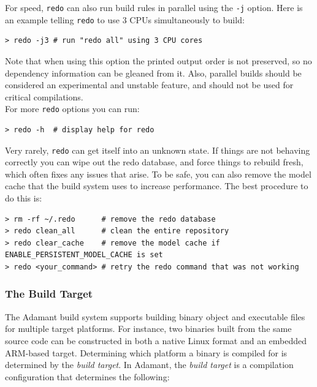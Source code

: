 For speed, \texttt{redo} can also run build rules in parallel using the \texttt{-j} option. Here is an example telling \texttt{redo} to use 3 CPUs simultaneously to build:

\vspace{5mm} %
\begin{verbatim}
> redo -j3 # run "redo all" using 3 CPU cores
\end{verbatim}
\vspace{5mm} %

Note that when using this option the printed output order is not preserved, so no dependency information can be gleaned from it. Also, parallel builds should be considered an experimental and unstable feature, and should not be used for critical compilations. \\

For more \texttt{redo} options you can run:

\vspace{5mm} %
\begin{verbatim}
> redo -h  # display help for redo
\end{verbatim}
\vspace{5mm} %

Very rarely, \texttt{redo} can get itself into an unknown state. If things are not behaving correctly you can wipe out the redo database, and force things to rebuild fresh, which often fixes any issues that arise. To be safe, you can also remove the model cache that the build system uses to increase performance. The best procedure to do this is:

\vspace{5mm} %
\begin{verbatim}
> rm -rf ~/.redo      # remove the redo database
> redo clean_all      # clean the entire repository
> redo clear_cache    # remove the model cache if ENABLE_PERSISTENT_MODEL_CACHE is set
> redo <your_command> # retry the redo command that was not working
\end{verbatim}
\vspace{5mm} %

\subsubsection{The Build Target} \label{The Build Target}

The Adamant build system supports building binary object and executable files for multiple target platforms. For instance, two binaries built from the same source code can be constructed in both a native Linux format and an embedded ARM-based target. Determining which platform a binary is compiled for is determined by the \textit{build target}. In Adamant, the \textit{build target} is a compilation configuration that determines the following:

